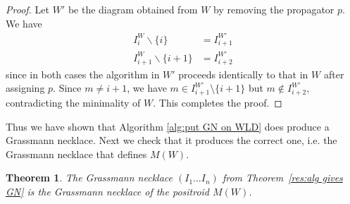 \documentclass[11pt]{article}
\newtheorem{thm}{Theorem}[section]
\theoremstyle{remark}
\theoremstyle{definition}
\begin{document}
\begin{proof}
Let $W'$ be the diagram obtained from $W$ by removing the propagator $p$.  We have
\begin{align*}
  I_i^{W} \backslash \{i\} & = I_{i+1}^{W'} \\
  I_{i+1}^{W} \backslash \{i+1\} & = I_{i+2}^{W'}
\end{align*}
since in both cases the algorithm in $W'$ proceeds identically to that in $W$ after assigning $p$. Since $m \neq i+1$, we have $m\in I_{i+1}^{W'}\setminus\{i+1\}$ but $m\not\in I_{i+2}^{W'}$, contradicting the minimality of $W$. This completes the proof.
\end{proof}

Thus we have shown that Algorithm \ref{alg:put GN on WLD} does produce a Grassmann necklace. Next we check that it produces the correct one, i.e. the Grassmann necklace that defines $M(W)$. 
\begin{thm}\label{res alg gives correct GN} 
The Grassmann necklace $(I_1 \ldots I_n)$ from Theorem~\ref{res:alg gives GN} is the Grassmann necklace of the positroid $M(W)$.
\end{thm}
\end{document}
